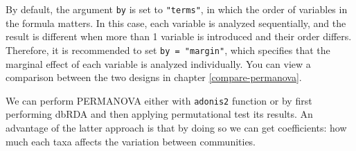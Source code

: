 \documentclass[
]{book}
\begin{document}
By default, the argument \texttt{by} is set to \texttt{"terms"}, in which the order of variables
in the formula matters. In this case, each variable is analyzed sequentially, and
the result is different when more than 1 variable is introduced and their order differs.
Therefore, it is recommended to set \texttt{by\ =\ "margin"}, which specifies that the
marginal effect of each variable is analyzed individually. You can view a
comparison between the two designs in chapter \ref{compare-permanova}.

We can perform PERMANOVA either with \texttt{adonis2} function or by first performing
dbRDA and then applying permutational test its results. An advantage of the latter
approach is that by doing so we can get coefficients: how much each taxa affects
the variation between communities.
\end{document}
